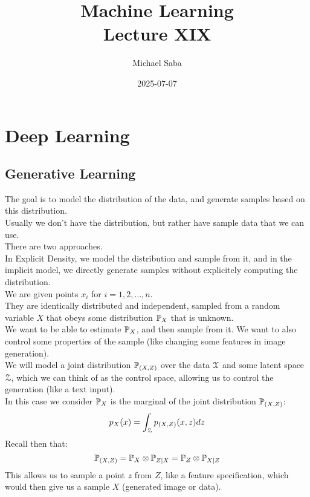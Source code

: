 \documentclass[12pt]{article}
\title{%
    \Huge Machine Learning \\
    \Large Lecture XIX
}
\date{2025-07-07}
\author{Michael Saba}
\begin{document}
\maketitle
\newpage
\setlength{\parindent}{0pt}

\section*{Deep Learning}
\subsection*{Generative Learning}

The goal is to model the distribution of the data,
and generate samples based on this distribution. \\

Usually we don't have the distribution, but rather
have sample data that we can use. \\

There are two approaches. \\
In Explicit Density, we model the distribution
and sample from it, and in the implicit model,
we directly generate samples without explicitely
computing the distribution. \\

We are given points $x_i$ for $i = 1, 2, \dots, n$. \\
They are identically distributed and independent,
sampled from a random variable $X$
that obeys some distribution $\mathbb{P}_X$
that is unknown. \\

We want to be able to estimate $\mathbb{P}_X$,
and then sample from it. We want to also control
some properties of the sample (like changing
some features in image generation). \\

We will model a joint distribution
$\mathbb{P}_{(X, Z)}$ over the data $\mathcal{X}$
and some latent space $\mathcal{Z}$,
which we can think of as the control space,
allowing us to control the generation (like a text
input). \\

In this case we consider $\mathbb{P}_X$
is the marginal of the joint distribution 
$\mathbb{P}_{(X, Z)}$:
\[ p_X(x) = \int_{\mathcal{Z}} p_{(X, Z)}(x, z) dz \]
Recall then that:
\[ \mathbb{P}_{(X, Z)} = \mathbb{P}_X \otimes \mathbb{P}_{Z \mid X} 
= \mathbb{P}_Z \otimes \mathbb{P}_{X \mid Z} \]
This allows us to sample a point $z$ from $Z$,
like a feature specification, 
which would then give us a sample $X$
(generated image or data). \\
\end{document}
